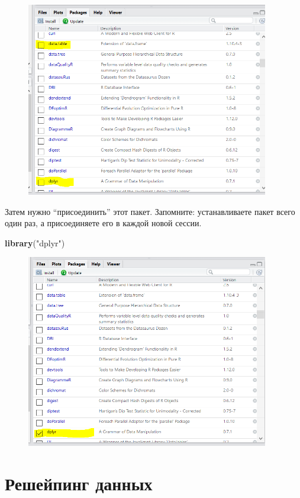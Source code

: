 \documentclass[]{book}
\newenvironment{Shaded}{\begin{snugshade}}{\end{snugshade}}
\newcommand{\KeywordTok}[1]{\textcolor[rgb]{0.13,0.29,0.53}{\textbf{#1}}}
\newcommand{\StringTok}[1]{\textcolor[rgb]{0.31,0.60,0.02}{#1}}
\newcommand{\NormalTok}[1]{#1}
\begin{document}
\begin{figure}
\centering
\includegraphics[width=4.16667in]{images/packages.PNG}
\caption{}
\end{figure}

Затем нужно ``присоединить'' этот пакет. Запомните: устанавливаете пакет
всего один раз, а присоединяете его в каждой новой сессии.

\begin{Shaded}
\begin{Highlighting}[]
\KeywordTok{library}\NormalTok{(}\StringTok{"dplyr"}\NormalTok{)}
\end{Highlighting}
\end{Shaded}

\begin{figure}
\centering
\includegraphics[width=4.16667in]{images/pack2.PNG}
\caption{}
\end{figure}

\section{Решейпинг данных}\label{reshape}
\end{document}
